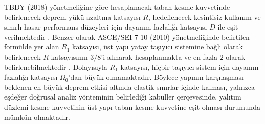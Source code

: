 TBDY (2018) yönetmeliğine göre hesaplanacak taban kesme kuvvetinde
belirlenecek deprem yükü azaltma katsayısı $R$, hedeflenecek kesintisiz
kullanım ve sınırlı hasar performans düzeyleri için dayanım fazlalığı
katsayısı $D$ ile eşit verilmektedir \cite{TBDY2018}. Benzer olarak
ASCE/SEI-7-10 (2010) yönetmeliğinde belirtilen formülde yer alan $R_{1}$
katsayısı, üst yapı yatay taşıyıcı sistemine bağlı olarak belirlenecek
$R$ katsayısının $3/8$'i alınarak hesaplanmakta ve en fazla $2$
olarak belirlenebilmektedir \cite{ASCE2010}. Dolayısıyla $R_{1}$
katsayısı, hiçbir taşıyıcı sistem için dayanım fazlalığı katsayısı
$\Omega_{\text{0}}$'dan büyük olmamaktadır. Böylece yapının karşılaşması
beklenen en büyük deprem etkisi altında elastik sınırlar içinde kalması,
yalnızca eşdeğer doğrusal analiz yönteminin belirlediği kabuller çerçevesinde,
yalıtım düzlemi kesme kuvvetinin üst yapı taban kesme kuvvetine eşit
olması durumunda mümkün olmaktadır.
